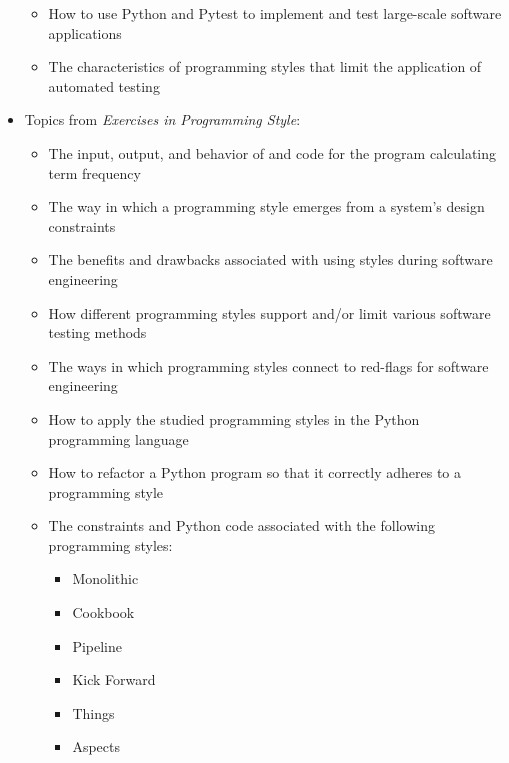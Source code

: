 \documentclass[11pt]{article}
\newcommand{\programmingstyle}{{\em Exercises in Programming Style\/}}
\begin{document}
\begin{itemize}
\begin{itemize}
      \item How to use Python and Pytest to implement and test large-scale
        software applications

      \item The characteristics of programming styles that limit the application
        of automated testing


    \end{itemize}

  \item Topics from \programmingstyle{}:
    \vspace*{-.05in}
    \begin{itemize}

      \itemsep 0.1in

      \item The input, output, and behavior of and code for the program
        calculating term frequency

      \item The way in which a programming style emerges from a system's design constraints

      \item The benefits and drawbacks associated with using styles during
        software engineering

      \item How different programming styles support and/or limit various
        software testing methods

      \item The ways in which programming styles connect to red-flags for
        software engineering

      \item How to apply the studied programming styles in the Python
        programming language

      \item How to refactor a Python program so that it correctly adheres to a
        programming style

      \item The constraints and Python code associated with the following
        programming styles:

        \begin{itemize}
          \itemsep 0.05in
          \item Monolithic
          \item Cookbook
          \item Pipeline
          \item Kick Forward
          \item Things
          \item Aspects
        \end{itemize}

    \end{itemize}

\end{itemize}
\end{document}

